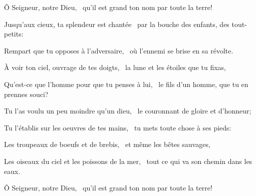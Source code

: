 \item Ô Seigneur, notre Dieu,~\psstar{} qu'il est grand ton nom par toute la terre!
\item Jusqu'aux cieux, ta splendeur est chantée~\psstar{} par la bouche des enfants, des tout-petits:
\item Rempart que tu opposes à l'adversaire,~\psstar{} où l'ennemi se brise en sa révolte.
\item À voir ton ciel, ouvrage de tes doigts,~\psstar{} la lune et les étoiles que tu fixas,
\item Qu'est-ce que l'homme pour que tu penses à lui,~\psstar{} le fils d'un homme, que tu en prennes souci?
\item Tu l'as voulu un peu moindre qu'un dieu,~\psstar{} le couronnant de gloire et d'honneur;
\item Tu l'établis sur les oeuvres de tes mains,~\psstar{} tu mets toute chose à ses pieds:
\item Les troupeaux de boeufs et de brebis,~\psstar{} et même les bêtes sauvages,
\item Les oiseaux du ciel et les poissons de la mer,~\psstar{} tout ce qui va son chemin dans les eaux.
\item Ô Seigneur, notre Dieu,~\psstar{} qu'il est grand ton nom par toute la terre!